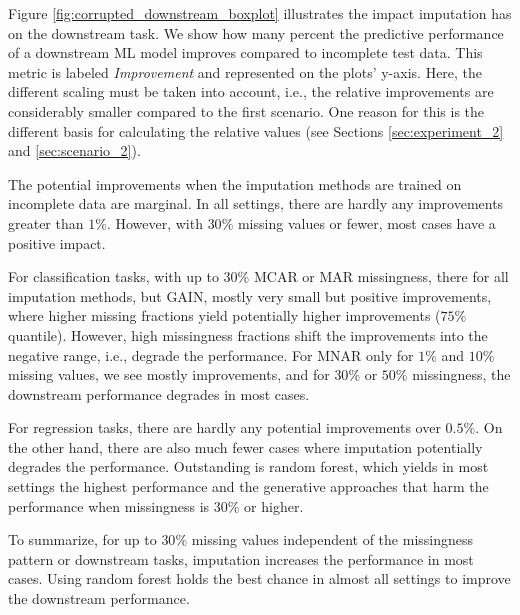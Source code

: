 \documentclass[utf8]{frontiersSCNS} %
\begin{document}
Figure \ref{fig:corrupted_downstream_boxplot} illustrates the impact imputation has on the downstream task. We show how many percent the predictive performance of a downstream ML model improves compared to incomplete test data. This metric is labeled \textit{Improvement} and represented on the plots' y-axis. Here, the different scaling must be taken into account, i.e., the relative improvements are considerably smaller compared to the first scenario. One reason for this is the different basis for calculating the relative values (see Sections \ref{sec:experiment_2} and \ref{sec:scenario_2}).

The potential improvements when the imputation methods are trained on incomplete data are marginal. In all settings, there are hardly any improvements greater than $1\%$. However, with $30\%$ missing values or fewer, most cases have a positive impact.

For classification tasks, with up to $30\%$ MCAR or MAR missingness, there for all imputation methods, but GAIN, mostly very small but positive improvements, where higher missing fractions yield potentially higher improvements ($75\%$ quantile). However, high missingness fractions shift the improvements into the negative range, i.e., degrade the performance. For MNAR only for $1\%$ and $10\%$ missing values, we see mostly improvements, and for $30\%$ or $50\%$ missingness, the downstream performance degrades in most cases.

For regression tasks, there are hardly any potential improvements over $0.5\%$. On the other hand, there are also much fewer cases where imputation potentially degrades the performance. Outstanding is random forest, which yields in most settings the highest performance and the generative approaches that harm the performance when missingness is $30\%$ or higher.

To summarize, for up to $30\%$ missing values independent of the missingness pattern or downstream tasks, imputation increases the performance in most cases. Using random forest holds the best chance in almost all settings to improve the downstream performance.
\end{document}
